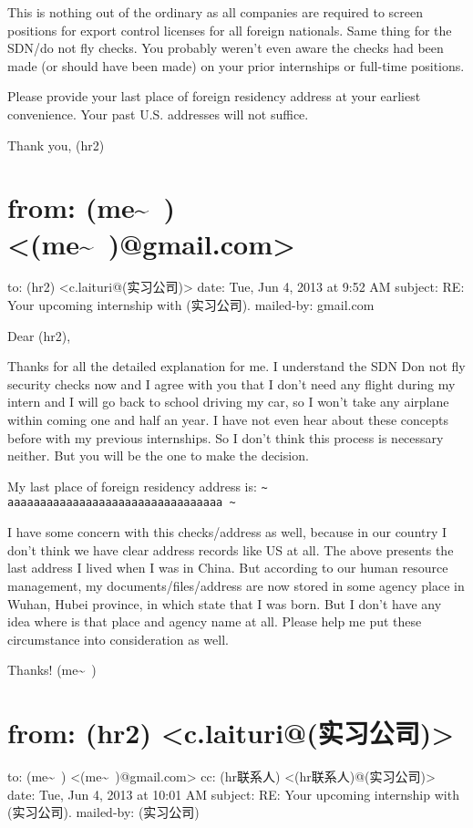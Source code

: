 \documentclass[12pt]{book}
\begin{document}
This is nothing out of the ordinary as all companies are required to screen positions for export control licenses for all foreign nationals. Same thing for the SDN/do not fly checks. You probably weren't even aware the checks had been made (or should have been made) on your prior internships or full-time positions.

Please provide your last place of foreign residency address at your earliest convenience.  Your past U.S. addresses will not suffice.

Thank you,
(hr2)


\section{from:         (me\textasciitilde{}~) <(me\textasciitilde{}~)@gmail.com>}
\label{sec-39-4}
to:         (hr2) <c.laituri@(实习公司)>
date:         Tue, Jun 4, 2013 at 9:52 AM
subject:         RE: Your upcoming internship with (实习公司).
mailed-by:         gmail.com

Dear (hr2),

Thanks for all the detailed explanation for me. I understand the SDN Don not fly security checks now and I agree with you that I don't need any flight during my intern and I will go back to school driving my car, so I won't take any airplane within coming one and half an year. I have not even hear about these concepts before with my previous internships. So I don't think this process is necessary neither. But you will be the one to make the decision.

My last place of foreign residency address is: \verb,~ aaaaaaaaaaaaaaaaaaaaaaaaaaaaaaaaa ~,

I have some concern with this checks/address as well, because in our country I don't think we have clear address records like US at all. The above presents the last address I lived when I was in China. But according to our human resource management, my documents/files/address are now stored in some agency place in Wuhan, Hubei province, in which state that I was born. But I don't have any idea where is that place and agency name at all. Please help me put these circumstance into consideration as well.

Thanks!
(me\textasciitilde{}~)


\section{from:         (hr2) <c.laituri@(实习公司)>}
\label{sec-39-5}
to:         (me\textasciitilde{}~) <(me\textasciitilde{}~)@gmail.com>
cc:         (hr联系人) <(hr联系人)@(实习公司)>
date:         Tue, Jun 4, 2013 at 10:01 AM
subject:         RE: Your upcoming internship with (实习公司).
mailed-by:         (实习公司)
\end{document}
